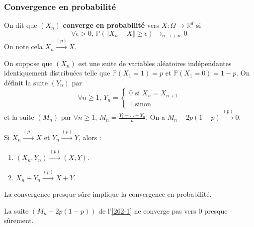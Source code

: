   \subsubsection{Convergence en probabilité}


  \begin{definition}
    On dit que $(X_n)$ \textbf{converge en probabilité} vers $X : \Omega \rightarrow \mathbb{R}^d$ si
    \[ \forall \epsilon>0, \, \mathbb{P}(\Vert X_n - X \Vert \geq \epsilon) \longrightarrow_{n\rightarrow+\infty} 0 \]
    On note cela $X_n \overset{(p)}{\longrightarrow} X$.
  \end{definition}


  \begin{example}
    \label{262-1}
    On suppose que $(X_n)$ est une suite de variables aléatoires indépendantes identiquement distribuées telle que $\mathbb{P}(X_1 = 1) = p$ et $\mathbb{P}(X_1 = 0) = 1-p$. On définit la suite $(Y_n)$ par
    \[
    \forall n \geq 1, \, Y_n = \begin{cases}
      0 \text{ si } X_n = X_{n+1} \\
      1 \text{ sinon}
    \end{cases}
    \]
    et la suite $(M_n)$ par $\forall n \geq 1, \, M_n = \frac{Y_1 + \dots + Y_n}{n}$. On a $M_n - 2p(1-p) \overset{(p)}{\longrightarrow} 0$.
  \end{example}


  \begin{proposition}
    Si $X_n \overset{(p)}{\longrightarrow} X$ et $Y_n \overset{(p)}{\longrightarrow} Y$, alors :
    \begin{enumerate}[label={\bfseries(\roman*)}]
      \item $(X_n, Y_n) \overset{(p)}{\longrightarrow} (X, Y)$.
      \item $X_n + Y_n \overset{(p)}{\longrightarrow} X + Y$.
    \end{enumerate}
  \end{proposition}

  \begin{theorem}
    La convergence presque sûre implique la convergence en probabilité.
  \end{theorem}


  \begin{cexample}
    La suite $(M_n - 2p(1-p))$ de l'\cref{262-1} ne converge pas vers $0$ presque sûrement.
  \end{cexample}

